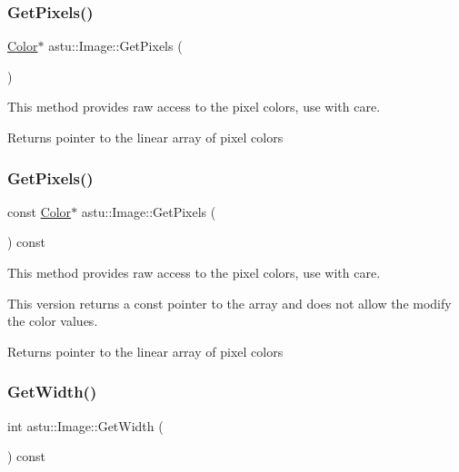 \subsubsection{\texorpdfstring{Get\+Pixels()}{GetPixels()}\hspace{0.1cm}{\footnotesize\ttfamily [1/2]}}
{\footnotesize\ttfamily \hyperlink{classastu_1_1Color}{Color}$\ast$ astu\+::\+Image\+::\+Get\+Pixels (\begin{DoxyParamCaption}{ }\end{DoxyParamCaption})}

This method provides raw access to the pixel colors, use with care.

\begin{DoxyReturn}{Returns}
pointer to the linear array of pixel colors 
\end{DoxyReturn}
\mbox{\label{classastu_1_1Image_ad2f3de6cc397bbc924c3718e54b1182f}} 
\subsubsection{\texorpdfstring{Get\+Pixels()}{GetPixels()}\hspace{0.1cm}{\footnotesize\ttfamily [2/2]}}
{\footnotesize\ttfamily const \hyperlink{classastu_1_1Color}{Color}$\ast$ astu\+::\+Image\+::\+Get\+Pixels (\begin{DoxyParamCaption}{ }\end{DoxyParamCaption}) const}

This method provides raw access to the pixel colors, use with care.

This version returns a const pointer to the array and does not allow the modify the color values.

\begin{DoxyReturn}{Returns}
pointer to the linear array of pixel colors 
\end{DoxyReturn}
\mbox{\label{classastu_1_1Image_a654888b88e109da1099ade3ec54f0520}} 
\subsubsection{\texorpdfstring{Get\+Width()}{GetWidth()}}
{\footnotesize\ttfamily int astu\+::\+Image\+::\+Get\+Width (\begin{DoxyParamCaption}{ }\end{DoxyParamCaption}) const\hspace{0.3cm}{\ttfamily [inline]}}

